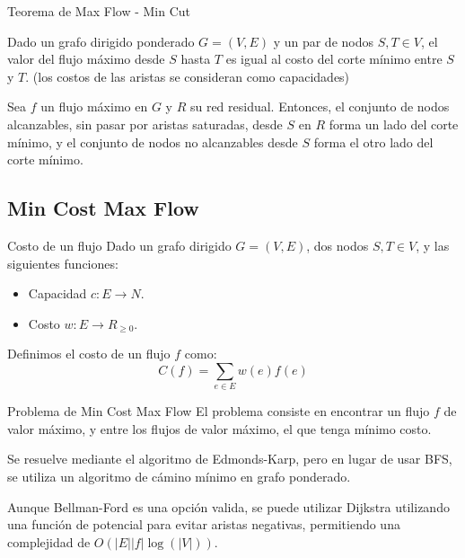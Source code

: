 \documentclass{beamer}
\begin{document}
\begin{frame}{Teorema de Max Flow - Min Cut}
    \begin{Theorem}
        Dado un grafo dirigido ponderado $G = (V,E)$ y un par de nodos $S, T \in V$, el valor del flujo máximo desde $S$ hasta $T$ es igual al costo del corte mínimo entre $S$ y $T$.
        (los costos de las aristas se consideran como capacidades)
    \end{Theorem}
    
    \pause

    \begin{Theorem}
        Sea $f$ un flujo máximo en $G$ y $R$ su red residual. Entonces, el conjunto de nodos alcanzables, sin pasar por aristas saturadas, desde $S$ en $R$ forma un lado del corte mínimo, y el conjunto de nodos no alcanzables desde $S$ forma el otro lado del corte mínimo.

    \end{Theorem}
\end{frame}



\subsection{ Min Cost Max Flow }

\begin{frame}{Costo de un flujo}
    Dado un grafo dirigido $G = (V,E)$, dos nodos $S,T \in V$, y las siguientes funciones:
    
    \begin{itemize}
        \item Capacidad $c: E \to N$.
        \item Costo $w: E \to R_{\geq 0}$.
    \end{itemize}

    Definimos el costo de un flujo $f$ como:
    \[
        C(f) = \sum_{e \in E} w(e)f(e)
    \]
\end{frame}

\begin{frame}{Problema de Min Cost Max Flow}
    El problema consiste en encontrar un flujo $f$ de valor máximo, y entre los flujos de valor máximo, el que tenga mínimo costo.

    Se resuelve mediante el algoritmo de Edmonds-Karp, pero en lugar de usar BFS, se utiliza un algoritmo de cámino mínimo en grafo ponderado.

    Aunque Bellman-Ford es una opción valida, se puede utilizar Dijkstra utilizando una función de potencial para evitar aristas negativas, permitiendo una complejidad de
    $O(|E||f|\log(|V|) )$.
\end{frame}
\end{document}
